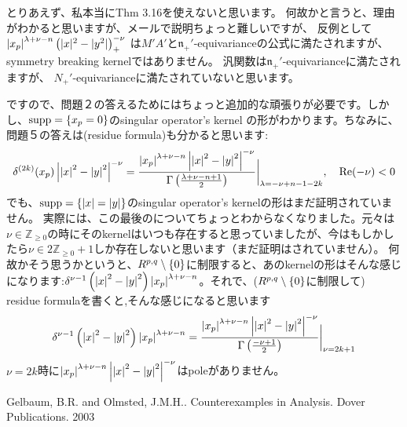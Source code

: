 \documentclass[10pt]{article} %
\title{}
\author{}
\begin{document}
\begin{CJK}{UTF8}{min}
\maketitle
とりあえず、私本当にThm 3.16を使えないと思います。
何故かと言うと、理由がわかると思いますが、メールで説明ちょっと難しいですが、
反例として $\left|x_p\right|^{\lambda+\nu-n}\left(|x|^2-|y^2|\right)^{-\nu}_+$
は$M'A'$と$\mathfrak{n_+'}$-equivarianceの公式に満たされますが、
symmetry breaking kernelではありません。
汎関数は$\mathfrak{n}_+'$-equivarianceに満たされますが、
$N_+'$-equivarianceに満たされていないと思います。

ですので、問題２の答えるためにはちょっと追加的な頑張りが必要です。しかし、$\operatorname{supp}=\left\{ x_p=0 \right\}$のsingular operator's kernel
の形がわかります。ちなみに、問題５の答えは(residue formula)も分かると思います:
\[\delta^{ (2k) }(x_p)\left| \left| x \right|^2-\left|y\right|^2 \right|^{ -\nu }=\frac{\left| x_p \right|^{ \lambda+\nu-n }\left| 
\left| x \right|^2-\left| y \right|^2\right|^{ -\nu }}{ \Gamma\left( \frac{ \lambda+\nu-n+1}{2} \right) }\bigg|_{ \lambda=-\nu+n-1-2k },\quad\operatorname{Re}(-\nu)<0\]
でも、$\operatorname{supp}=\left\{ \left| x \right|=\left| y \right| \right\}$のsingular operator's kernelの形はまだ証明されていません。
実際には、この最後のについてちょっとわからなくなりました。元々は$\nu\in\mathbb{Z}_{ \geq0 }$の時にそのkernelはいつも存在すると思っていましたが、今はもしかしたら$\nu\in2\mathbb{Z}_{ \geq0 }+1$しか存在しないと思います（まだ証明はされていません）。
何故かそう思うかというと、$R^{ p,q }\setminus\left\{ 0 \right\}$に制限すると、あのkernelの形はそんな感じになります:$\delta^{ \nu-1 }\left( \left| x \right|^2-\left| y \right|^2 \right)\left| x_p \right|^{ \lambda+\nu-n }$。それで、($R^{ p,q }\setminus\left\{ 0 \right\}$に制限して)
residue formulaを書くと,そんな感じになると思います
\[\delta^{ \nu-1 }\left( \left| x \right|^2-\left| y \right|^2 \right)\left| x_p \right|^{ \lambda+\nu-n }=
\frac{\left| x_p \right|^{ \lambda+\nu-n }\left| 
	\left| x \right|^2-\left| y \right|^2\right|^{ -\nu }}{ \Gamma\left( \frac{ -\nu+1}{2} \right) }\bigg|_{ \nu=2k+1}
\]
$\nu=2k$時に${\left| x_p \right|^{ \lambda+\nu-n }\left| 
	\left| x \right|^2-\left| y \right|^2\right|^{ -\nu }}$はpoleがありません。

\end{CJK}
\begin{thebibliography}{9}
Gelbaum, B.R. and Olmsted, J.M.H.. Counterexamples in Analysis. Dover Publications. 2003
\end{thebibliography}
\end{document}
